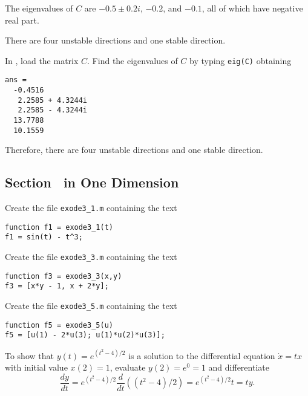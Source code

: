 \documentclass{ximera}
\begin{document}
\soln The eigenvalues of $C$ are $-0.5 \pm 0.2i$, $-0.2$, and $-0.1$, all
of which have negative real part.

 \ans There are four unstable directions and one stable 
direction.

\soln  In \Matlabp, load the matrix $C$.  Find the eigenvalues of $C$ by
typing {\tt eig(C)} obtaining
\begin{verbatim}
ans =
  -0.4516          
   2.2585 + 4.3244i
   2.2585 - 4.3244i
  13.7788          
  10.1559   
\end{verbatim}
Therefore, there are four unstable directions and one stable direction.



\subsection*{Section~\protect{\ref{S:ode45}}  in One Dimension}

Create the file {\tt exode3\_1.m} containing the text
\begin{verbatim}
function f1 = exode3_1(t)
f1 = sin(t) - t^3;
\end{verbatim}

Create the file {\tt exode3\_3.m} containing the text
\begin{verbatim}
function f3 = exode3_3(x,y)
f3 = [x*y - 1, x + 2*y];
\end{verbatim}

Create the file {\tt exode3\_5.m} containing the text
\begin{verbatim}
function f5 = exode3_5(u)
f5 = [u(1) - 2*u(3); u(1)*u(2)*u(3)];
\end{verbatim}

To show that $y(t)=e^{(t^2-4)/2}$ is a solution to the differential equation
$\dot{x}=tx$ with initial value $x(2)=1$, evaluate $y(2)=e^0=1$ and
differentiate
\[
\frac{dy}{dt} = e^{(t^2-4)/2}\frac{d}{dt}((t^2-4)/2) = 
e^{(t^2-4)/2}t = ty.
\]
\end{document}
